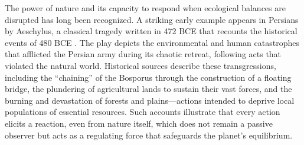 \documentclass[12pt]{Definitions/academia}
\begin{document}
The power of nature and its capacity to respond when ecological balances
are disrupted has long been recognized. A striking early example appears
in  Persians by Aeschylus, a classical tragedy written in 472 BCE
that recounts the historical events of 480 BCE \textit{\cite{Aeschylus,Aeschylus-1}}.
The play depicts the environmental and human catastrophes that afflicted
the Persian army during its chaotic retreat, following acts that violated
the natural world. Historical sources describe these transgressions,
including the \textquotedblleft chaining\textquotedblright{} of the
Bosporus through the construction of a floating bridge, the plundering
of agricultural lands to sustain their vast forces, and the burning
and devastation of forests and plains---actions intended to deprive
local populations of essential resources. Such accounts illustrate
that every action elicits a reaction, even from nature itself, which
does not remain a passive observer but acts as a regulating force
that safeguards the planet\textquoteright s equilibrium.
\end{document}
